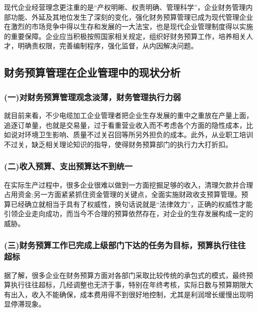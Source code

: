     现代企业经营理念更注重的是“产权明晰、权责明确、管理科学”，企业财务管理内部功能、外延及其地位发生了深刻的变化，强化财务预算管理已成为现代管理企业在激烈的市场竞争中得以生存和发展的一大法宝，也是现代企业管理制度得以实施的重要保障。企业应当积极按照国家相关规定，组织好财务预算工作，培养相关人才，明确责权限，完善编制程序，强化监督，从内因解决问题。

\subsection {财务预算管理在企业管理中的现状分析}

   \subsubsection { (一)对财务预算管理观念淡薄，财务管理执行力弱}

    就目前来看，不少电缆加工企业管理者把企业生存发展的重中之重放在产量上面，追逐订单量，也就是交易量，过于看重营业收入而不考虑各个方面的隐性成本，比如说对环境卫生影响、质量不过关召回等所另外担负的成本。此外，从业职工培训不过关，缺乏相关理论知识的指导，使得财务预算部门的执行力大打折扣。

    \subsubsection {(二)收入预算、支出预算达不到统一}

    在实际生产过程中，很多企业很难以做到一方面挖掘足够的收入，清理欠款并合理占用资金;另一方面紧紧抓住资金管理的关键点，全面实施财政收支预算管理。预算已经确立就相当于具有了权威性，换句话说就是“法律效力”，正确的权威性才能引领企业走向成功，而当今不合理的预算依然存在，对企业的生存发展构成一定的威胁。

    \subsubsection {(三)财务预算工作已完成上级部门下达的任务为目标，预算执行往往超标}

    据了解，很多企业在财务预算方面对各部门采取比较传统的承包式的模式，最终预算执行往往超标，几经调整也无济于事，特别在年终考核，实际日数与预算期限大有出入，收入不能确保，成本费用得不到很好地控制，尤其是利润增长缓慢出现明显停滞现象。
